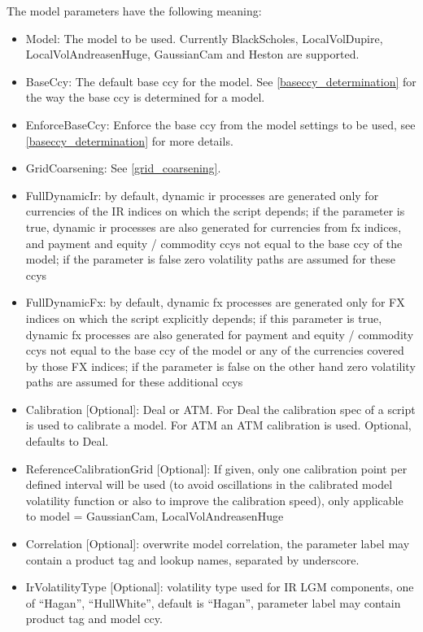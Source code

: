 The model parameters have the following meaning:

\begin{itemize}
\item Model: The model to be used. Currently BlackScholes, LocalVolDupire, LocalVolAndreasenHuge, GaussianCam and
  Heston are supported.
\item BaseCcy: The default base ccy for the model. See \ref{baseccy_determination} for the way the base ccy is
  determined for a model.
\item EnforceBaseCcy: Enforce the base ccy from the model settings to be used, see \ref{baseccy_determination} for more
  details.
\item GridCoarsening: See \ref{grid_coarsening}.
\item FullDynamicIr: by default, dynamic ir processes are generated only for currencies of the IR indices on which the
  script depends; if the parameter is true, dynamic ir processes are also generated for currencies from fx indices, and
  payment and equity / commodity ccys not equal to the base ccy of the model; if the parameter is false zero volatility
  paths are assumed for these ccys
\item FullDynamicFx: by default, dynamic fx processes are generated only for FX indices on which the script explicitly
  depends; if this parameter is true, dynamic fx processes are also generated for payment and equity / commodity ccys
  not equal to the base ccy of the model or any of the currencies covered by those FX indices; if the parameter is false
  on the other hand zero volatility paths are assumed for these additional ccys
\item Calibration [Optional]: Deal or ATM. For Deal the calibration spec of a script is used to calibrate a model. For
  ATM an ATM calibration is used. Optional, defaults to Deal.
\item ReferenceCalibrationGrid [Optional]: If given, only one calibration point per defined interval will be used (to avoid
  oscillations in the calibrated model volatility function or also to improve the calibration speed), only applicable to
  model = GaussianCam, LocalVolAndreasenHuge
\item Correlation [Optional]: overwrite model correlation, the parameter label may contain a product tag and lookup names,
  separated by underscore.
\item IrVolatilityType [Optional]: volatility type used for IR LGM components, one of ``Hagan'', ``HullWhite'', default is
  ``Hagan'', parameter label may contain product tag and model ccy.

\end{itemize}
